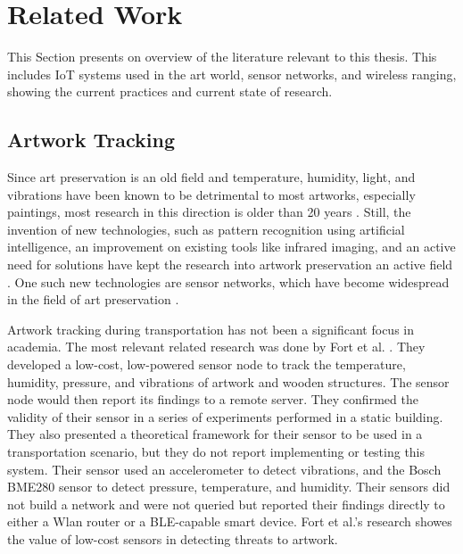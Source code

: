 \section{Related Work} %
\label{s:related_works}

This Section presents on overview of the literature relevant to this thesis.
This includes IoT systems used in the art world, sensor networks, and wireless ranging, showing the current practices and current state of research.


\subsection{Artwork Tracking}


Since art preservation is an old field and temperature, humidity, light, and vibrations have been known to be detrimental to most artworks, especially paintings, most research in this direction is older than 20 years \cite{mecklenburg1991mechanical, michalski1991paintings, saunders2004effect}.
Still, the invention of new technologies, such as pattern recognition using artificial intelligence, an improvement on existing tools like infrared imaging, and an active need for solutions have kept the research into artwork preservation an active field \cite{borg2020application, schito2017integrated}.
One such new technologies are sensor networks, which have become widespread in the field of art preservation \cite{shah2016customized}.


Artwork tracking during transportation has not been a significant focus in academia.
The most relevant related research was done by Fort et al. \cite{landi2022iot}.
They developed a low-cost, low-powered sensor node to track the temperature, humidity, pressure, and vibrations of artwork and wooden structures.
The sensor node would then report its findings to a remote server.
They confirmed the validity of their sensor in a series of experiments performed in a static building.
They also presented a theoretical framework for their sensor to be used in a transportation scenario, but they do not report implementing or testing this system.
Their sensor used an accelerometer to detect vibrations, and the Bosch BME280 sensor to detect pressure, temperature, and humidity.
Their sensors did not build a network and were not queried but reported their findings directly to either a Wlan router or a BLE-capable smart device.
Fort et al.'s research showes the value of low-cost sensors in detecting threats to artwork.


